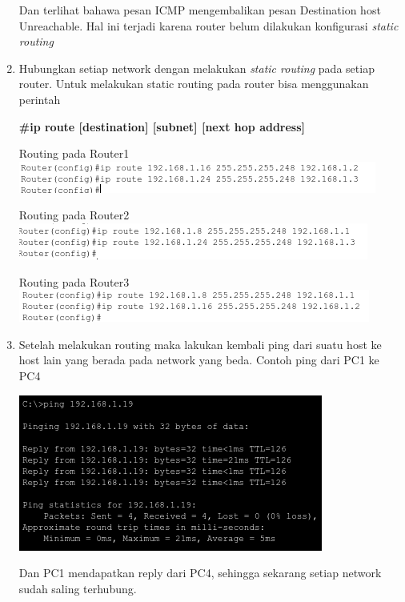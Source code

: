 \documentclass{article}
\begin{document}
\begin{flushleft}
\begin{enumerate}
            Dan terlihat bahawa pesan ICMP mengembalikan pesan Destination host Unreachable. Hal ini terjadi karena router belum dilakukan konfigurasi \textit{static routing}

            \item Hubungkan setiap network dengan melakukan \textit{static routing} pada setiap router. Untuk melakukan static routing pada router bisa menggunakan perintah 
            
            \begin{center}
                \textbf{\#ip route [destination] [subnet] [next hop address]}
            \end{center}

            Routing pada Router1
            \includegraphics[scale=0.9]{1-13.png}

            Routing pada Router2
            \includegraphics[scale=0.9]{1-14.png}

            Routing pada Router3
            \includegraphics[scale=0.9]{1-15.png}

            \item Setelah melakukan routing maka lakukan kembali ping dari suatu host ke host lain yang berada pada network yang beda. Contoh ping dari PC1 ke PC4
            
            \includegraphics[scale=0.7]{1-16.png}

            Dan PC1 mendapatkan reply dari PC4, sehingga sekarang setiap network sudah saling terhubung.
        \end{enumerate}
    \end{flushleft}
\end{document}
